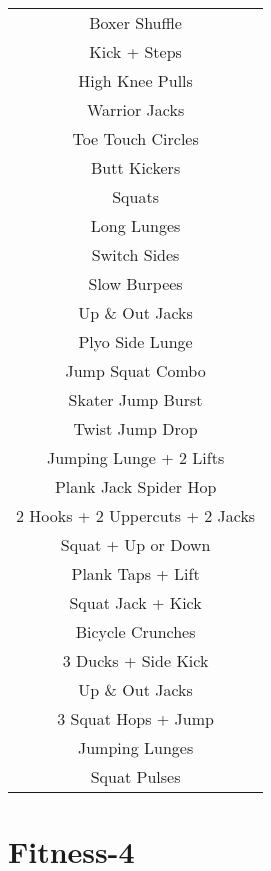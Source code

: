 \documentclass[12pt]{article}
\newcommand\myPadding{1.5}
\begin{document}
\begin{center}
  \bgroup
  \def\arraystretch{\myPadding}%
  \begin{tabular}{ c  }
Boxer Shuffle
\\
Kick + Steps
\\
High Knee Pulls
\\
Warrior Jacks
\\
Toe Touch Circles
\\
Butt Kickers
\\
Squats
\\
Long Lunges
\\
Switch Sides
\\
Slow Burpees
\\
Up \& Out Jacks
\\
Plyo Side Lunge
\\
Jump Squat Combo
\\
Skater Jump Burst
\\
Twist Jump Drop
\\
Jumping Lunge + 2 Lifts
\\
Plank Jack Spider Hop
\\
2 Hooks + 2 Uppercuts + 2 Jacks
\\
Squat + Up or Down
\\
Plank Taps + Lift
\\
Squat Jack + Kick
\\
Bicycle Crunches
\\
3 Ducks + Side Kick
\\
Up \& Out Jacks
\\
3 Squat Hops + Jump
\\
Jumping Lunges
\\
Squat Pulses
  \end{tabular}
  \egroup
\end{center}




\section{Fitness-4}
\end{document}
